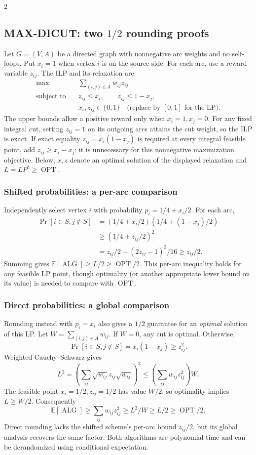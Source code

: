 \documentclass[8pt]{extarticle}
\theoremstyle{definition}
\newcommand{\OPT}{\operatorname{OPT}}
\newcommand{\ALG}{\operatorname{ALG}}
\begin{document}
\begin{multicols*}{2}
\subsection{MAX-DICUT: two \texorpdfstring{$1/2$}{1/2} rounding proofs}\label{lp:dicut}
Let $G=(V,A)$ be a directed graph with nonnegative arc weights and no
self-loops. Put $x_i=1$ when vertex $i$ is on the source side. For each arc,
use a reward variable $z_{ij}$. The ILP and its relaxation are
\[
  \begin{aligned}
    \max\quad&\sum_{(i,j)\in A}w_{ij}z_{ij}\\
    \text{subject to}\quad&z_{ij}\le x_i,\qquad z_{ij}\le1-x_j,\\
    &x_i,z_{ij}\in\{0,1\}\quad
       \text{(replace by }[0,1]\text{ for the LP).}
  \end{aligned}
\]
The upper bounds allow a positive reward only when $x_i=1,x_j=0$.
For any fixed integral cut, setting $z_{ij}=1$ on its outgoing arcs attains
the cut weight, so the ILP is exact. If exact equality
$z_{ij}=x_i(1-x_j)$ is required at every integral feasible point, add
$z_{ij}\ge x_i-x_j$; it is unnecessary for this nonnegative maximization
objective. Below, $x,z$ denote an optimal solution of the displayed
relaxation and $L=LP^*\ge\OPT$.

\subsubsection*{Shifted probabilities: a per-arc comparison}
Independently select vertex $i$ with probability $p_i=1/4+x_i/2$.
For each arc,
\[
  \begin{aligned}
    \Pr[i\in S,j\notin S]
      &=(1/4+x_i/2)(1/4+(1-x_j)/2)\\
      &\ge(1/4+z_{ij}/2)^2\\
      &=z_{ij}/2+(2z_{ij}-1)^2/16\ge z_{ij}/2.
  \end{aligned}
\]
Summing gives $\mathbb E[\ALG]\ge L/2\ge\OPT/2$.
This per-arc inequality holds for any feasible LP point, though optimality
(or another appropriate lower bound on its value) is needed to compare
with $\OPT$.

\subsubsection*{Direct probabilities: a global comparison}
Rounding instead with $p_i=x_i$ also gives a $1/2$ guarantee for an
\emph{optimal} solution of this LP. Let $W=\sum_{(i,j)\in A}w_{ij}$.
If $W=0$, any cut is optimal. Otherwise,
\[
  \Pr[i\in S,j\notin S]=x_i(1-x_j)\ge z_{ij}^2.
\]
Weighted Cauchy--Schwarz gives
\[
  L^2=\left(\sum_{ij}\sqrt{w_{ij}}z_{ij}\sqrt{w_{ij}}\right)^2
    \le\left(\sum_{ij}w_{ij}z_{ij}^2\right)W.
\]
The feasible point $x_i=1/2,z_{ij}=1/2$ has value $W/2$, so optimality
implies $L\ge W/2$. Consequently
\[
  \mathbb E[\ALG]\ge\sum_{ij}w_{ij}z_{ij}^2
    \ge L^2/W\ge L/2\ge\OPT/2.
\]
Direct rounding lacks the shifted scheme's per-arc bound $z_{ij}/2$,
but its global analysis recovers the same factor. Both algorithms are
polynomial time and can be derandomized using conditional expectation.


\end{multicols*}
\end{document}
